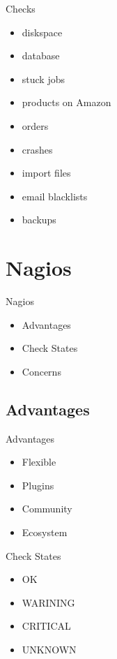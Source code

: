 \begin{frame}[fragile]{Checks}
\begin{itemize}
\item diskspace
\item database
\item stuck jobs
\item products on Amazon
\item orders
\item crashes
\item import files
\item email blacklists
\item backups
\end{itemize}
\end{frame}

\section{Nagios}

\begin{frame}[fragile]{Nagios}
\begin{itemize}
\item Advantages
\item Check States
\item Concerns
\end{itemize}
\end{frame}

\subsection{Advantages}
\begin{frame}[fragile]{Advantages}
\begin{itemize}
\item Flexible
\item Plugins
\item Community
\item Ecosystem
\end{itemize}
\end{frame}

\begin{frame}[fragile]{Check States}
\begin{itemize}
\item OK
\item WARINING 
\item CRITICAL
\item UNKNOWN
\end{itemize}
\end{frame}

